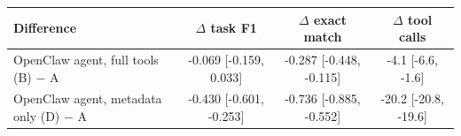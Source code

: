 \begin{tabular}{@{}lccc@{}}
\toprule
Difference & $\Delta$ task F1 & $\Delta$ exact match & $\Delta$ tool calls \\
\midrule
OpenClaw agent, full tools (B) $-$ A & -0.069 [-0.159, 0.033] & -0.287 [-0.448, -0.115] & -4.1 [-6.6, -1.6] \\
OpenClaw agent, metadata only (D) $-$ A & -0.430 [-0.601, -0.253] & -0.736 [-0.885, -0.552] & -20.2 [-20.8, -19.6] \\
\bottomrule
\end{tabular}
